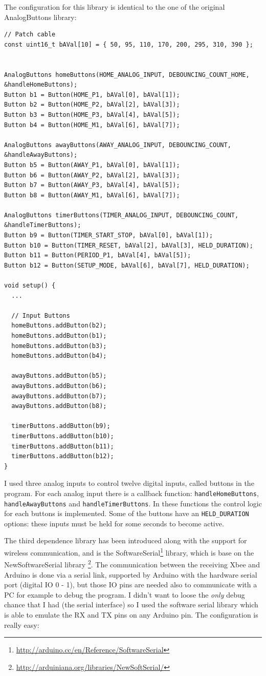\documentclass[11pt,english]{article}
\newcommand{\code}[1]{\texttt{#1}}
\begin{document}
The configuration for this library is identical to the one of the original AnalogButtons library:
%
\begin{lstlisting}[label=lis:buttons-config,caption=AnalogButtonsGeneral configuration]
// Patch cable
const uint16_t bAVal[10] = { 50, 95, 110, 170, 200, 295, 310, 390 };


AnalogButtons homeButtons(HOME_ANALOG_INPUT, DEBOUNCING_COUNT_HOME, &handleHomeButtons);
Button b1 = Button(HOME_P1, bAVal[0], bAVal[1]);
Button b2 = Button(HOME_P2, bAVal[2], bAVal[3]);
Button b3 = Button(HOME_P3, bAVal[4], bAVal[5]);
Button b4 = Button(HOME_M1, bAVal[6], bAVal[7]);

AnalogButtons awayButtons(AWAY_ANALOG_INPUT, DEBOUNCING_COUNT, &handleAwayButtons);
Button b5 = Button(AWAY_P1, bAVal[0], bAVal[1]);
Button b6 = Button(AWAY_P2, bAVal[2], bAVal[3]);
Button b7 = Button(AWAY_P3, bAVal[4], bAVal[5]);
Button b8 = Button(AWAY_M1, bAVal[6], bAVal[7]);

AnalogButtons timerButtons(TIMER_ANALOG_INPUT, DEBOUNCING_COUNT, &handleTimerButtons);
Button b9 = Button(TIMER_START_STOP, bAVal[0], bAVal[1]);
Button b10 = Button(TIMER_RESET, bAVal[2], bAVal[3], HELD_DURATION);
Button b11 = Button(PERIOD_P1, bAVal[4], bAVal[5]);
Button b12 = Button(SETUP_MODE, bAVal[6], bAVal[7], HELD_DURATION);

void setup() {
  ...

  // Input Buttons
  homeButtons.addButton(b2);
  homeButtons.addButton(b1);
  homeButtons.addButton(b3);
  homeButtons.addButton(b4);
  
  awayButtons.addButton(b5);
  awayButtons.addButton(b6);
  awayButtons.addButton(b7);
  awayButtons.addButton(b8);

  timerButtons.addButton(b9);
  timerButtons.addButton(b10);
  timerButtons.addButton(b11);
  timerButtons.addButton(b12);
}

\end{lstlisting}

I used three analog inputs to control twelve digital inputs, called buttons in the program. 
For each analog input there is a callback function: \code{handleHomeButtons}, \code{handleAwayButtons}  
and \code{handleTimerButtons}. In these functions the control logic for each buttons is implemented.
Some of the buttons have an \code{HELD\_DURATION} options: these inputs must be held for some seconds to become active.

The third dependence library has been introduced along with the support for wireless communication, and is the SoftwareSerial\footnote{\url{http://arduino.cc/en/Reference/SoftwareSerial}} 
library, which is base on the NewSoftwareSerial library \footnote{\url{http://arduiniana.org/libraries/NewSoftSerial/}}. 
The communication between the receiving Xbee and Arduino is done via a serial link, supported by Arduino with 
the hardware serial port (digital IO 0 - 1), but those IO pins are needed also to communicate with a PC for example to debug the 
program. I didn't want to loose the \emph{only} debug chance that I had (the serial interface) so I used the software serial library 
which is able to emulate the RX and TX pins on any Arduino pin. The configuration is really easy:
\end{document}
